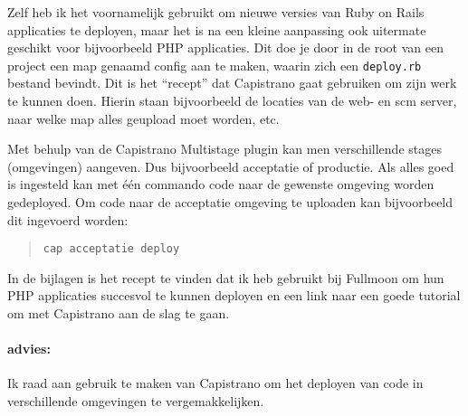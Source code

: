Zelf heb ik het voornamelijk gebruikt om nieuwe versies van Ruby on Rails applicaties te deployen, maar het is na een kleine aanpassing ook uitermate geschikt voor bijvoorbeeld PHP applicaties. Dit doe je door in de root van een project een map genaamd config aan te maken, waarin zich een \texttt{deploy.rb} bestand bevindt. Dit is het ``recept'' dat Capistrano gaat gebruiken om zijn werk te kunnen doen. Hierin staan bijvoorbeeld de locaties van de web- en {\sc scm} server, naar welke map alles geupload moet worden, etc.

Met behulp van de Capistrano Multistage plugin\cite{capistranomultistage} kan men verschillende stages (omgevingen) aangeven. Dus bijvoorbeeld acceptatie of productie. Als alles goed is ingesteld kan met één commando code naar de gewenste omgeving worden gedeployed. Om code naar de acceptatie omgeving te uploaden kan bijvoorbeeld dit ingevoerd worden:

\begin{quote}
  \texttt{cap acceptatie deploy}
\end{quote}

In de bijlagen is het recept te vinden dat ik heb gebruikt bij Fullmoon om hun PHP applicaties succesvol te kunnen deployen en een link naar een goede tutorial om met Capistrano aan de slag te gaan.

\paragraph{advies:} Ik raad aan gebruik te maken van Capistrano om het deployen van code in verschillende omgevingen te vergemakkelijken.
